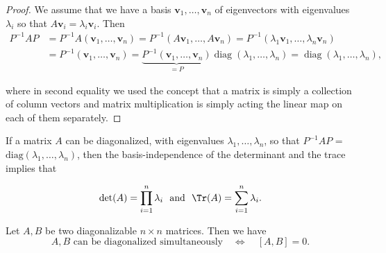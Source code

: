 \documentclass[a4paper,12pt]{report}
\begin{document}
\begin{proof}
We assume that we have a basis \( \mathbf{v}_1, \dots, \mathbf{v}_n \) of eigenvectors with eigenvalues \( \lambda_i \) so that \(A \mathbf{v}_i = \lambda_i \mathbf{v}_i\). Then
\begin{equation}
\begin{aligned}
P^{-1} A P &= P^{-1} A (\mathbf{v}_1, \dots, \mathbf{v}_n) 
           = P^{-1} (A \mathbf{v}_1, \dots, A \mathbf{v}_n) 
           = P^{-1} (\lambda_1 \mathbf{v}_1, \dots, \lambda_n \mathbf{v}_n) \\
           &= P^{-1} (\mathbf{v}_1, \dots, \mathbf{v}_n) 
           = \underbrace{P^{-1} (\mathbf{v}_1, \dots, \mathbf{v}_n)}_{=P} 
           \operatorname{diag}(\lambda_1, \dots, \lambda_n) 
           = \operatorname{diag}(\lambda_1, \dots, \lambda_n),
\end{aligned}
\end{equation}

where in second equality we used the concept that a matrix is simply a collection of column vectors and matrix multiplication is simply acting the linear map on each of them separately.
\end{proof}



If a matrix \(A\) can be diagonalized, with eigenvalues \(\lambda _{1}, \ldots , \lambda _{n}   \), so that \(P^{-1} AP\) = \(\text{diag}(\lambda _{1}, \ldots , \lambda _{n}  ) \), then the basis-independence of the determinant and the trace implies that

\begin{equation}
    \det (A) = \prod_{i=1}^{n} \lambda _{i} ~\text { and }~  \Tr (A) = \sum_{i=1}^{n} \lambda _{i}.  
\end{equation}

\begin{theorem}

Let $A,B$ be two diagonalizable $n\times n$ matrices.  Then we have
\begin{equation}
A,B\text{ can be diagonalized simultaneously}
\quad\Longleftrightarrow\quad
[A,B]=0.
\end{equation}
\end{theorem}
\end{document}
